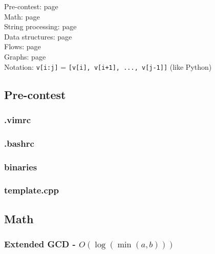 \documentclass[landscape,a4paper,twocolumn,10pt]{report}
\begin{document}
\footnotesize

\noindent
Pre-contest: page \pageref{precontest} \\
Math: page \pageref{math} \\
String processing: page \pageref{string} \\
Data structures: page \pageref{datastruct} \\
Flows: page \pageref{flows} \\
Graphs: page \pageref{graphs} \\

\noindent
Notation: \verb#v[i:j]# = \verb#[v[i], v[i+1], ..., v[j-1]]# (like Python)

\subsection*{Pre-contest}
\label{precontest}

\subsubsection{.vimrc}


\subsubsection*{.bashrc}


\subsubsection*{binaries}


\subsubsection{template.cpp}




\subsection*{Math}
\label{math}

\subsubsection{Extended GCD - $O(\log(\min(a, b)))$}

\end{document}
